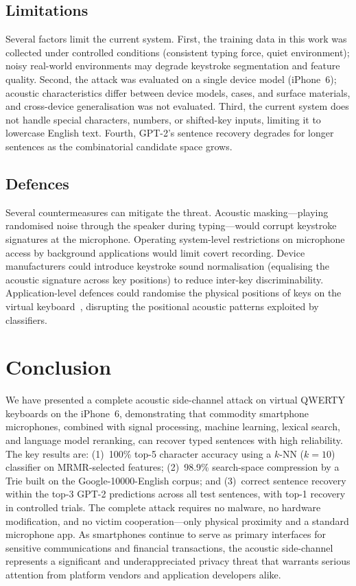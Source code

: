 \documentclass[conference]{IEEEtran}
\begin{document}
\subsection{Limitations}

Several factors limit the current system. First, the training data in this work was collected under controlled conditions (consistent typing force, quiet environment); noisy real-world environments may degrade keystroke segmentation and feature quality. Second, the attack was evaluated on a single device model (iPhone~6); acoustic characteristics differ between device models, cases, and surface materials, and cross-device generalisation was not evaluated. Third, the current system does not handle special characters, numbers, or shifted-key inputs, limiting it to lowercase English text. Fourth, GPT-2's sentence recovery degrades for longer sentences as the combinatorial candidate space grows.

\subsection{Defences}

Several countermeasures can mitigate the threat. Acoustic masking---playing randomised noise through the speaker during typing---would corrupt keystroke signatures at the microphone. Operating system-level restrictions on microphone access by background applications would limit covert recording. Device manufacturers could introduce keystroke sound normalisation (equalising the acoustic signature across key positions) to reduce inter-key discriminability. Application-level defences could randomise the physical positions of keys on the virtual keyboard~\cite{lu2019keylistener}, disrupting the positional acoustic patterns exploited by classifiers.

\section{Conclusion}

We have presented a complete acoustic side-channel attack on virtual QWERTY keyboards on the iPhone~6, demonstrating that commodity smartphone microphones, combined with signal processing, machine learning, lexical search, and language model reranking, can recover typed sentences with high reliability. The key results are: (1)~100\% top-5 character accuracy using a $k$-NN ($k{=}10$) classifier on MRMR-selected features; (2)~98.9\% search-space compression by a Trie built on the Google-10000-English corpus; and (3)~correct sentence recovery within the top-3 GPT-2 predictions across all test sentences, with top-1 recovery in controlled trials. The complete attack requires no malware, no hardware modification, and no victim cooperation---only physical proximity and a standard microphone app. As smartphones continue to serve as primary interfaces for sensitive communications and financial transactions, the acoustic side-channel represents a significant and underappreciated privacy threat that warrants serious attention from platform vendors and application developers alike.
\end{document}
